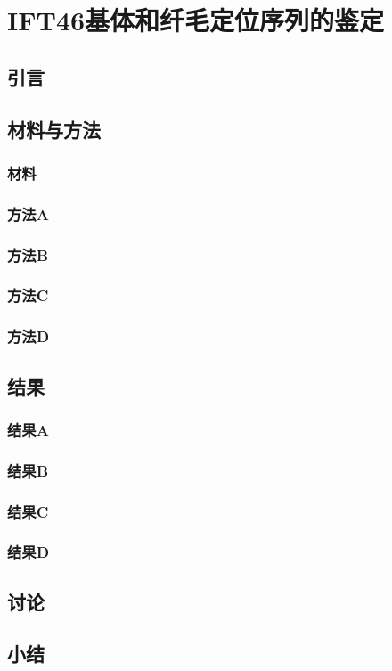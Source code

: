 \chapter{IFT46基体和纤毛定位序列的鉴定}
\renewcommand{\leftmark}{第四章\quad IFT46基体和纤毛定位序列的鉴定}

\section{引言}
\blindtext

\section{材料与方法}
\subsection{材料}
\Blindtext

\subsection{方法A}
\Blindtext

\subsection{方法B}
\Blindtext

\subsection{方法C}
\Blindtext

\subsection{方法D}
\Blindtext

\section{结果}
\subsection{结果A}
\Blindtext

\subsection{结果B}
\Blindtext

\subsection{结果C}
\Blindtext

\subsection{结果D}
\Blindtext

\section{讨论}
\Blindtext

\section{小结}
\Blindtext